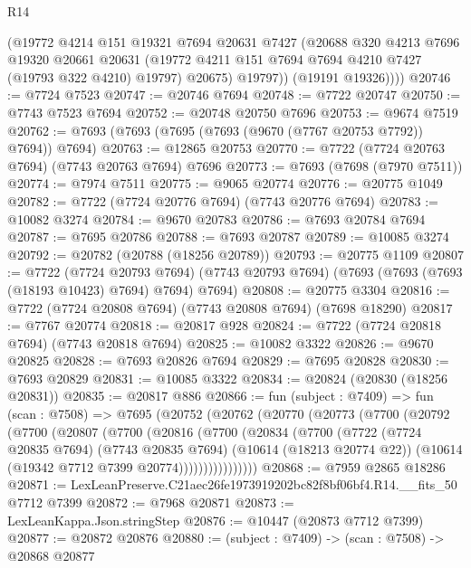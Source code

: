 \begin{lexlean}{R14}
\begin{coremodule}
            (@19772
              @4214
              @151
              @19321
              @7694
              @20631
              @7427
              (@20688
                @320
                @4213
                @7696
                @19320
                @20661
                @20631
                (@19772 @4211 @151 @7694 @7694 @4210 @7427 (@19793 @322 @4210) @19797)
                @20675)
              @19797))
          (@19191 @19326))))
@20746 := @7724 @7523
@20747 := @20746 @7694
@20748 := @7722 @20747
@20750 := @7743 @7523 @7694
@20752 := @20748 @20750 @7696
@20753 := @9674 @7519
@20762 := @7693 (@7693 (@7695 (@7693 (@9670 (@7767 @20753 @7792)) @7694)) @7694)
@20763 := @12865 @20753
@20770 := @7722 (@7724 @20763 @7694) (@7743 @20763 @7694) @7696
@20773 := @7693 (@7698 (@7970 @7511))
@20774 := @7974 @7511
@20775 := @9065 @20774
@20776 := @20775 @1049
@20782 := @7722 (@7724 @20776 @7694) (@7743 @20776 @7694)
@20783 := @10082 @3274
@20784 := @9670 @20783
@20786 := @7693 @20784 @7694
@20787 := @7695 @20786
@20788 := @7693 @20787
@20789 := @10085 @3274
@20792 := @20782 (@20788 (@18256 @20789))
@20793 := @20775 @1109
@20807 := @7722
    (@7724 @20793 @7694)
    (@7743 @20793 @7694)
    (@7693 (@7693 (@7693 (@18193 @10423) @7694) @7694) @7694)
@20808 := @20775 @3304
@20816 := @7722 (@7724 @20808 @7694) (@7743 @20808 @7694) (@7698 @18290)
@20817 := @7767 @20774
@20818 := @20817 @928
@20824 := @7722 (@7724 @20818 @7694) (@7743 @20818 @7694)
@20825 := @10082 @3322
@20826 := @9670 @20825
@20828 := @7693 @20826 @7694
@20829 := @7695 @20828
@20830 := @7693 @20829
@20831 := @10085 @3322
@20834 := @20824 (@20830 (@18256 @20831))
@20835 := @20817 @886
@20866 := fun (subject : @7409) =>
  fun (scan : @7508) =>
  @7695
    (@20752
      (@20762
        (@20770
          (@20773
            (@7700
              (@20792
                (@7700
                  (@20807
                    (@7700
                      (@20816
                        (@7700
                          (@20834
                            (@7700
                              (@7722
                                (@7724 @20835 @7694)
                                (@7743 @20835 @7694)
                                (@10614 (@18213 @20774 @22))
                                (@10614 (@19342 @7712 @7399 @20774))))))))))))))))
@20868 := @7959 @2865 @18286
@20871 := LexLeanPreserve.C21aec26fe1973919202bc82f8bf06bf4.R14.__fits_50 @7712 @7399
@20872 := @7968 @20871
@20873 := LexLeanKappa.Json.stringStep
@20876 := @10447 (@20873 @7712 @7399)
@20877 := @20872 @20876
@20880 := (subject : @7409) -> (scan : @7508) -> @20868 @20877

\end{coremodule}
\end{lexlean}
